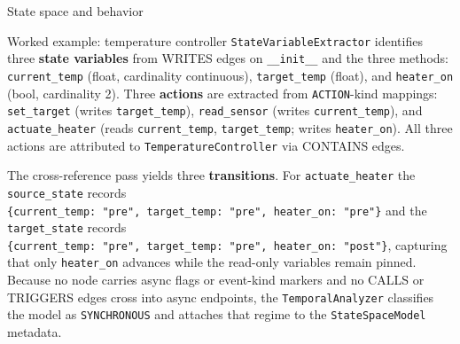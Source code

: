 \documentclass[
  ignorenonframetext,
]{beamer}
\begin{document}
\begin{frame}[fragile]{State space and behavior}
\begin{block}{Worked example: temperature controller}
\texttt{StateVariableExtractor} identifies three \textbf{state
variables} from WRITES edges on \texttt{\_\_init\_\_} and the three
methods: \texttt{current\_temp} (float, cardinality continuous),
\texttt{target\_temp} (float), and \texttt{heater\_on} (bool,
cardinality 2). Three \textbf{actions} are extracted from
\texttt{ACTION}-kind mappings: \texttt{set\_target} (writes
\texttt{target\_temp}), \texttt{read\_sensor} (writes
\texttt{current\_temp}), and \texttt{actuate\_heater} (reads
\texttt{current\_temp}, \texttt{target\_temp}; writes
\texttt{heater\_on}). All three actions are attributed to
\texttt{TemperatureController} via CONTAINS edges.

The cross-reference pass yields three \textbf{transitions}. For
\texttt{actuate\_heater} the \texttt{source\_state} records
\texttt{\{current\_temp:\ "pre",\ target\_temp:\ "pre",\ heater\_on:\ "pre"\}}
and the \texttt{target\_state} records
\texttt{\{current\_temp:\ "pre",\ target\_temp:\ "pre",\ heater\_on:\ "post"\}},
capturing that only \texttt{heater\_on} advances while the read-only
variables remain pinned. Because no node carries async flags or
event-kind markers and no CALLS or TRIGGERS edges cross into async
endpoints, the \texttt{TemporalAnalyzer} classifies the model as
\texttt{SYNCHRONOUS} and attaches that regime to the
\texttt{StateSpaceModel} metadata.
\end{block}
\end{frame}
\end{document}
